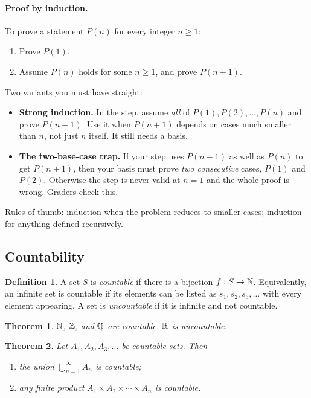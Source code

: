 \documentclass[11pt]{article}
\theoremstyle{plain}
\newtheorem{theorem}{Theorem}
\theoremstyle{definition}
\newtheorem{definition}{Definition}
\begin{document}
\paragraph{Proof by induction.} To prove a statement $P(n)$ for every integer $n \ge 1$:
\begin{enumerate}
  \item[\textbf{Basis.}] Prove $P(1)$.
  \item[\textbf{Step.}] Assume $P(n)$ holds for some $n \ge 1$, and prove $P(n+1)$.
\end{enumerate}
Two variants you must have straight:
\begin{itemize}
  \item \textbf{Strong induction.} In the step, assume \emph{all} of $P(1), P(2), \dots, P(n)$ and prove $P(n+1)$. Use it when $P(n+1)$ depends on cases much smaller than $n$, not just $n$ itself. It still needs a basis.
  \item \textbf{The two-base-case trap.} If your step uses $P(n-1)$ as well as $P(n)$ to get $P(n+1)$, then your basis must prove \emph{two consecutive} cases, $P(1)$ and $P(2)$. Otherwise the step is never valid at $n = 1$ and the whole proof is wrong. Graders check this.
\end{itemize}
Rules of thumb: induction when the problem reduces to smaller cases; induction for anything defined recursively.

\subsection{Countability}

\begin{definition}
A set $S$ is \emph{countable} if there is a bijection $f: S \to \mathbb{N}$. Equivalently, an infinite set is countable if its elements can be listed as $s_1, s_2, s_3, \dots$ with every element appearing. A set is \emph{uncountable} if it is infinite and not countable.
\end{definition}

\begin{theorem}
$\mathbb{N}$, $\mathbb{Z}$, and $\mathbb{Q}$ are countable. $\mathbb{R}$ is uncountable.
\end{theorem}

\begin{theorem}
Let $A_1, A_2, A_3, \dots$ be countable sets. Then
\begin{enumerate}
  \item[(a)] the union $\bigcup_{n=1}^{\infty} A_n$ is countable;
  \item[(b)] any finite product $A_1 \times A_2 \times \cdots \times A_n$ is countable.
\end{enumerate}
\end{theorem}
\end{document}
